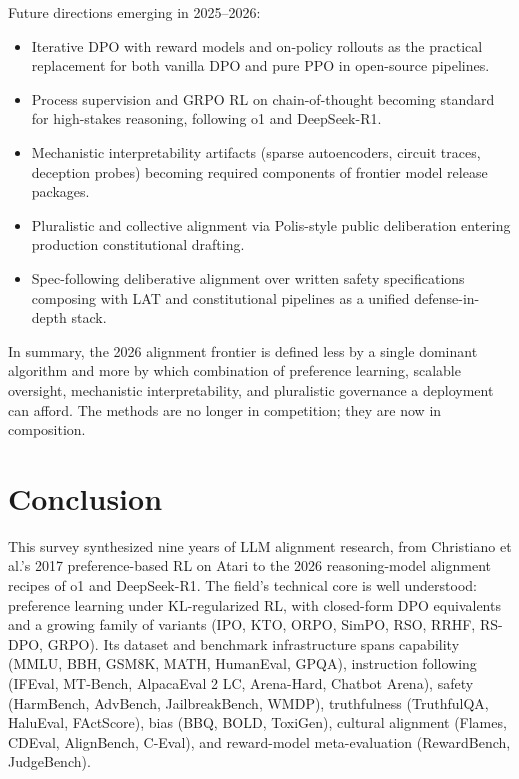 Future directions emerging in 2025--2026:

\begin{itemize}
\tightlist
\item
  Iterative DPO with reward models and on-policy rollouts as the practical replacement for both vanilla DPO and pure PPO in open-source pipelines.
\item
  Process supervision and GRPO RL on chain-of-thought becoming standard for high-stakes reasoning, following o1 and DeepSeek-R1.
\item
  Mechanistic interpretability artifacts (sparse autoencoders, circuit traces, deception probes) becoming required components of frontier model release packages.
\item
  Pluralistic and collective alignment via Polis-style public deliberation entering production constitutional drafting.
\item
  Spec-following deliberative alignment over written safety specifications composing with LAT and constitutional pipelines as a unified defense-in-depth stack.
\end{itemize}

In summary, the 2026 alignment frontier is defined less by a single dominant algorithm and more by which combination of preference learning, scalable oversight, mechanistic interpretability, and pluralistic governance a deployment can afford. The methods are no longer in competition; they are now in composition.

\section{Conclusion}\label{conclusion}

This survey synthesized nine years of LLM alignment research, from Christiano et al.'s 2017 preference-based RL on Atari to the 2026 reasoning-model alignment recipes of o1 and DeepSeek-R1. The field's technical core is well understood: preference learning under KL-regularized RL, with closed-form DPO equivalents and a growing family of variants (IPO, KTO, ORPO, SimPO, RSO, RRHF, RS-DPO, GRPO). Its dataset and benchmark infrastructure spans capability (MMLU, BBH, GSM8K, MATH, HumanEval, GPQA), instruction following (IFEval, MT-Bench, AlpacaEval 2 LC, Arena-Hard, Chatbot Arena), safety (HarmBench, AdvBench, JailbreakBench, WMDP), truthfulness (TruthfulQA, HaluEval, FActScore), bias (BBQ, BOLD, ToxiGen), cultural alignment (Flames, CDEval, AlignBench, C-Eval), and reward-model meta-evaluation (RewardBench, JudgeBench).

